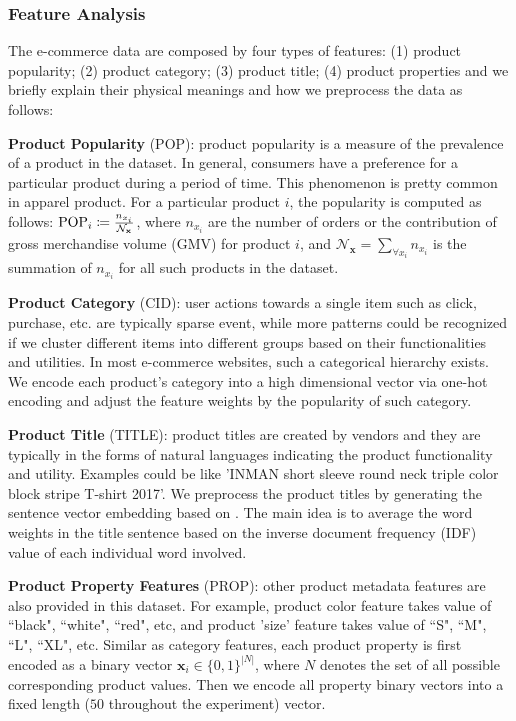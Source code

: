\subsubsection{Feature Analysis}
The e-commerce data are composed by four types of features: (1) product popularity; (2) product category; (3) product title; (4) product properties and we briefly explain their physical meanings and how we preprocess the data as follows:

\textbf{Product Popularity} (POP): product popularity is a measure of the prevalence of a product in the dataset. In general, consumers have a preference for a particular product during a period of time. This phenomenon is pretty common in apparel product. For a particular product $i$, the popularity is computed as follows: $\mathrm{\scriptsize POP}_{i} \coloneqq \frac{n_{x_i}}{\mathcal{N}_\mathbf{x}}$, where $n_{x_i}$ are the number of orders or the contribution of gross merchandise volume (GMV) for product $i$,  and $\mathcal{N}_\mathbf{x} = \sum_{\forall x_i}n_{x_i}$ is the summation of $n_{x_i}$ for all such products in the dataset. \newline

\textbf{Product Category} (CID): user actions towards a single item such as click, purchase, etc. are typically sparse event, while more patterns could be recognized if we cluster different items into different groups based on their functionalities and utilities.  In most e-commerce websites, such a categorical hierarchy exists.    We encode each product's category into a high dimensional vector via one-hot encoding and adjust the feature weights by the popularity of such category. \newline

\textbf{Product Title} (TITLE): product titles are created by vendors and they are typically in the forms of natural languages indicating the product functionality and utility.  Examples could be like 'INMAN short sleeve round neck triple color block stripe T-shirt 2017'.  We preprocess the product titles by generating the sentence vector embedding based on \cite{de2016representation}.  The main idea is to average the word weights in the title sentence based on the inverse document frequency (IDF) value of each individual word involved. \newline

\textbf{Product Property Features} (PROP): other product metadata features are also provided in this dataset. For example,  product color feature takes value of ``black", ``white", ``red", etc, and product 'size' feature takes value of ``S", ``M", ``L", ``XL", etc.  Similar as category features, each product property is first encoded as a binary vector $\bm{x}_i \in \{0, 1\}^{|N|}$, where $N$ denotes the set of all possible corresponding product values.  Then we encode all property binary vectors into a fixed length ($50$ throughout the experiment) vector. \newline

